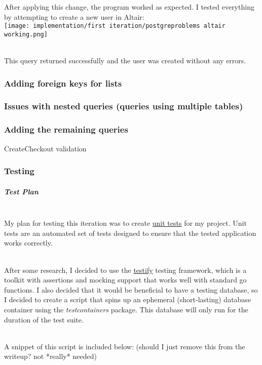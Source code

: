 \documentclass[../../main.tex]{subfiles}
\begin{document}
\noindent After applying this change, the program worked as expected. I tested everything by attempting to create a new user in Altair:\\

\texttt{[image: implementation/first iteration/postgreproblems altair working.png]}

\noindent \\ This query returned successfully and the user was created without any errors.

\subsubsection{Adding foreign keys for lists}

\subsubsection{Issues with nested queries (queries using multiple tables)}

\subsubsection{Adding the remaining queries}

CreateCheckout validation

\subsubsection{Testing}

\subparagraph{Test Plan}

\noindent \\ My plan for testing this iteration was to create \underline{unit tests} for my project. Unit tests are an automated set of tests designed to ensure that the tested application works correctly.

\noindent \\ After some research, I decided to use the \underline{testify} testing framework, which is a toolkit with assertions and mocking support that works well with standard go functions.
I also decided that it would be beneficial to have a testing database, so I decided to create a script that spins up an ephemeral (short-lasting) database container using the \textit{testcontainers} package. This database will only run for the duration of the test suite.

\noindent \\ A snippet of this script is included below: (should I just remove this from the writeup? not *really* needed)
\end{document}
